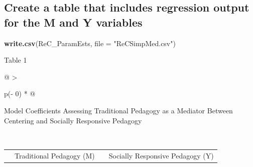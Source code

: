 \documentclass[
  11pt,
]{book}
\newenvironment{Shaded}{\begin{snugshade}}{\end{snugshade}}
\newcommand{\AttributeTok}[1]{\textcolor[rgb]{0.27,0.27,0.27}{#1}}
\newcommand{\FunctionTok}[1]{\textcolor[rgb]{0.27,0.27,0.27}{\textbf{#1}}}
\newcommand{\NormalTok}[1]{#1}
\newcommand{\StringTok}[1]{\textcolor[rgb]{0.5,0.5,0.5}{#1}}
\begin{document}
\hypertarget{create-a-table-that-includes-regression-output-for-the-m-and-y-variables}{%
\subsection*{Create a table that includes regression output for the M and Y variables}\label{create-a-table-that-includes-regression-output-for-the-m-and-y-variables}}


\begin{Shaded}
\begin{Highlighting}[]
\FunctionTok{write.csv}\NormalTok{(ReC\_ParamEsts, }\AttributeTok{file =} \StringTok{"ReCSimpMed.csv"}\NormalTok{)}
\end{Highlighting}
\end{Shaded}

Table 1

\begin{longtable}[]{@{}
  >{\raggedright\arraybackslash}p{(\columnwidth - 0\tabcolsep) * }@{}}
\toprule\noalign{}
\begin{minipage}[b]{\linewidth}\raggedright
Model Coefficients Assessing Traditional Pedagogy as a Mediator Between Centering and Socially Responsive Pedagogy
\end{minipage} \\
\midrule\noalign{}
\endhead
\bottomrule\noalign{}
\endlastfoot
\end{longtable}

\begin{longtable}[]{@{}
  >{\raggedright\arraybackslash}p{}
  >{\centering\arraybackslash}p{}
  >{\centering\arraybackslash}p{}
  >{\centering\arraybackslash}p{}@{}}
\toprule\noalign{}
\endhead
\bottomrule\noalign{}
\endlastfoot
& Traditional Pedagogy (M) & & Socially Responsive Pedagogy (Y) \\
\end{longtable}
\end{document}
